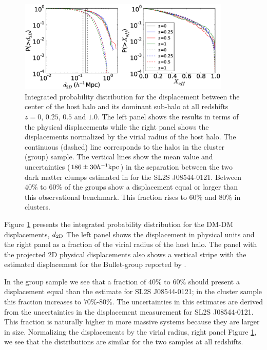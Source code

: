\documentclass{emulateapj}
\newcommand{\hkpc}{{\ifmmode{h^{-1}{\rm kpc}}\else{$h^{-1}$kpc }\fi}}
\newcommand{\bullg}{SL2S J08544-0121}
\begin{document}
\begin{figure}
\begin{center}
\includegraphics[width=0.9\textwidth]{figure_1.eps}
\end{center}
\caption{
  Integrated probability distribution for the displacement between the
  center of the host halo and its dominant sub-halo at all redshifts
  $z=0$, $0.25$, $0.5$ and $1.0$. The left panel
  shows the results in terms of the physical displacements while the
  right panel shows the displacements normalized by the virial radius
  of the host halo. The continuous (dashed) line corresponds to the halos in the
  cluster (group) sample.
  The vertical lines show the mean value and uncertainties ($186\pm
  30\hkpc$) in the  separation between the two dark matter clumps
  estimated in \citet{Gastaldello} for the \bullg. Between $40\%$
  to $60\%$ of the groups show a displacement equal or larger than
  this observational benchmark. This fraction rises to $60\%$ and
  $80\%$ in clusters.}
\label{fig:displacement}
\end{figure}

Figure \ref{fig:displacement} presents the integrated
probability distribution for the DM-DM displacements, $d_{\rm 2D}$ The
left panel shows the displacement in physical units and the right
panel as a fraction of the virial radius of the host halo.  The panel
with the projected 2D physical displacements also shows a vertical
stripe with the estimated displacement for the Bullet-group reported
by \cite{Gastaldello}.   

In the group sample we see that a fraction of
$40\%$ to $60\%$  should present a displacement equal than the
estimate for \bullg; in the cluster sample this fraction increases to
$70\%$-$80\%$. The uncertainties in this estimates are derived from
the uncertainties in the displacement measurement for \bullg. This
fraction is naturally higher in more massive systems because they are
larger in size. Normalizing the displacements by the virial radius,
right panel Figure \ref{fig:displacement}, we see that the
distributions are similar for the two samples at all redshifts.
\end{document}
